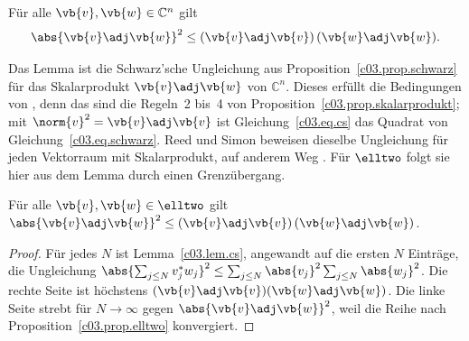 \begin{fundament}[id=c03.f1,
    titel={Die Cauchy-Schwarz-Ungleichung},
    wozu={Vertiefung~\ref{c03.v1} zeigt mit einer groben Abschätzung, dass das
      Skalarprodukt auf $\elltwo$ endlich ist. Hier steht die scharfe Schranke: Der Betrag
      des Skalarprodukts ist höchstens das Produkt der Längen.},
    voraussetzung={Proposition~\ref{c03.prop.skalarprodukt}, die Schwarz'sche Ungleichung
      (Proposition~\ref{c03.prop.schwarz}) und Vertiefung~\ref{c03.v1}. Kern und
      Vertiefungen brauchen den Block nicht.},
    zurueck={Für zwei Vektoren ist $\abs{\vb{v}\adj\vb{w}}^2$ nie größer als
      $(\vb{v}\adj\vb{v})(\vb{w}\adj\vb{w})$, in $\mathbb{C}^n$ wie in $\elltwo$.}]
  \begin{lemma}\label{c03.lem.cs}
    Für alle $\vb{v}, \vb{w} \in \mathbb{C}^n$ gilt
    \begin{equation}\label{c03.eq.cs}
      \abs{\vb{v}\adj\vb{w}}^2 \leq (\vb{v}\adj\vb{v})\,(\vb{w}\adj\vb{w}) .
    \end{equation}
  \end{lemma}

  Das Lemma ist die Schwarz'sche Ungleichung aus Proposition~\ref{c03.prop.schwarz} für das
  Skalarprodukt $\vb{v}\adj\vb{w}$ von $\mathbb{C}^n$. Dieses erfüllt die Bedingungen von
  , denn das sind die Regeln~2 bis~4 von Proposition~\ref{c03.prop.skalarprodukt};
  mit $\norm{v}^2 = \vb{v}\adj\vb{v}$ ist Gleichung~\eqref{c03.eq.cs} das Quadrat von
  Gleichung~\eqref{c03.eq.schwarz}. Reed und Simon beweisen dieselbe Ungleichung für jeden
  Vektorraum mit Skalarprodukt, auf anderem Weg . Für $\elltwo$
  folgt sie hier aus dem Lemma durch einen Grenzübergang.

  \begin{proposition}\label{c03.prop.cs-elltwo}
    Für alle $\vb{v}, \vb{w} \in \elltwo$ gilt
    $\abs{\vb{v}\adj\vb{w}}^2 \leq (\vb{v}\adj\vb{v})\,(\vb{w}\adj\vb{w})$.
  \end{proposition}
  \begin{proof}
    Für jedes $N$ ist Lemma~\ref{c03.lem.cs}, angewandt auf die ersten $N$ Einträge, die
    Ungleichung
    $\abs{\sum_{j \leq N} v_j^* w_j}^2 \leq \sum_{j \leq N} \abs{v_j}^2 \sum_{j \leq N} \abs{w_j}^2$.
    Die rechte Seite ist höchstens $(\vb{v}\adj\vb{v})(\vb{w}\adj\vb{w})$. Die linke Seite
    strebt für $N \to \infty$ gegen $\abs{\vb{v}\adj\vb{w}}^2$, weil die Reihe nach
    Proposition~\ref{c03.prop.elltwo} konvergiert.
  \end{proof}
\end{fundament}

